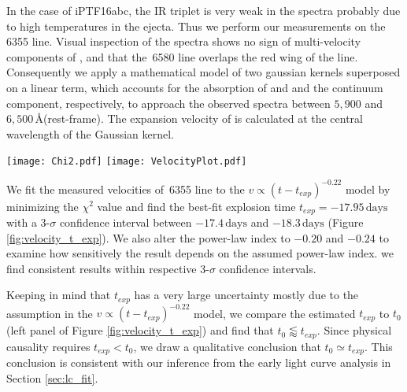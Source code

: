 \documentclass[twocolumn]{aastex61}
\begin{document}
In the case of iPTF16abc, the  IR triplet is very weak in
the spectra probably due to high temperatures in the ejecta. Thus we
perform our measurements on the \,6355 line. Visual
inspection of the spectra shows no sign of multi-velocity components
of , and that the \,6580 line overlaps the red
wing of the  line. Consequently we apply a mathematical
model of two gaussian kernels superposed on a linear term, which
accounts for the absorption of  and  and the
continuum component, respectively, to approach the observed spectra
between $5,900$ and $6,500$\,\AA (rest-frame). The expansion
velocity of  is calculated at the central wavelength
of the  Gaussian kernel.

\begin{figure*}[!thb]
  \centering
  \texttt{[image: Chi2.pdf]}
  \texttt{[image: VelocityPlot.pdf]}
  \caption{Constraints on $t_{exp}$ from fitting the velocity
    evolution of .
    \textit{Left panel:} the dashed, solid
    and dash-dotted curves show $\chi^2$ for fitting power laws with
    indices $-0.20$, $-0.22$ and $-0.24$, respectively. The red
    vertical line and the orange region indicate $t_0$ and its
    3-$\sigma$ confidence interval from Section
    \ref{sec:lc_fit}.
    \textit{Right panel:} Observed \,6355
    velocities and the best-fit power-law velocity with an index of
    $-0.22$.}
  \label{fig:velocity_t_exp}
\end{figure*}

We fit the measured velocities of \,6355 line to the
$v\propto(t-t_{exp})^{-0.22}$ model by minimizing the $\chi^2$ value
and find the best-fit explosion time $t_{exp}=-17.95\,\textrm{days}$
with a 3-$\sigma$ confidence interval between $-17.4\,\textrm{days}$
and $-18.3\,\textrm{days}$ (Figure \ref{fig:velocity_t_exp}). We also
alter the power-law index to $-0.20$ and $-0.24$ to examine how
sensitively the result depends on the assumed power-law index.  we
find consistent results within respective 3-$\sigma$ confidence
intervals.

Keeping in mind that $t_{exp}$ has a very large uncertainty mostly due
to the assumption in the $v\propto(t-t_{exp})^{-0.22}$ model, we
compare the estimated $t_{exp}$ to $t_0$ (left panel of Figure
\ref{fig:velocity_t_exp}) and find that $t_0\lessapprox t_{exp}$.
Since physical causality requires $t_{exp}<t_0$, we draw a qualitative
conclusion that $t_0\simeq t_{exp}$. This conclusion is consistent
with our inference from the early light curve analysis in Section
\ref{sec:lc_fit}.
\end{document}
